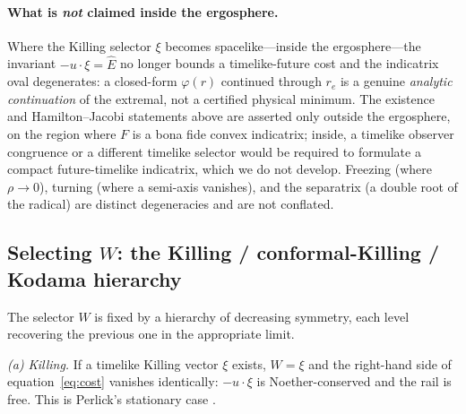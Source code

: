 \documentclass[12pt]{iopart}
\newcommand{\Ehat}{\hat E}
\newcommand{\re}{r_{e}}
\begin{document}
\paragraph{What is \emph{not} claimed inside the ergosphere.} Where the Killing
selector $\xi$ becomes spacelike---inside the ergosphere---the invariant
$-u\cdot\xi=\Ehat$ no longer bounds a timelike-future cost and the indicatrix oval
degenerates: a closed-form $\varphi(r)$ continued through $\re$ is a genuine
\emph{analytic continuation} of the
extremal, not a certified physical minimum. The existence and Hamilton--Jacobi
statements above are asserted only outside the ergosphere, on the region where $F$
is a bona fide convex indicatrix; inside, a timelike observer congruence or a different
timelike selector would be required to formulate a compact future-timelike indicatrix,
which we do not develop. Freezing (where
$\rho\to0$), turning (where a semi-axis vanishes), and the separatrix (a double
root of the radical) are distinct degeneracies and are not conflated.

\subsection{Selecting $W$: the Killing / conformal-Killing / Kodama hierarchy}
\label{sec:whierarchy}
The selector $W$ is fixed by a hierarchy of decreasing symmetry, each level
recovering the previous one in the appropriate limit.

\emph{(a) Killing.} If a timelike Killing vector $\xi$ exists, $W=\xi$ and the
right-hand side of equation~\eqref{eq:cost} vanishes identically: $-u\cdot\xi$ is
Noether-conserved and the rail is free. This is Perlick's stationary case
\cite{Perlick1991}.
\end{document}
